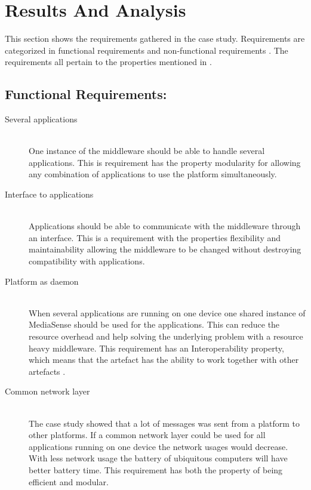 \section{Results And Analysis}
This section shows the requirements gathered in the case study. Requirements are categorized in functional requirements and non-functional requirements \cite{Roman1985}. The requirements all pertain to the properties mentioned in \cite{johannesson2012design}. 

\subsection{Functional Requirements:}
\begin{description}
	\item[Several applications] \hfill \\
	One instance of the middleware should be able to handle several applications.
	This is requirement has the property modularity for allowing any combination of applications to use the platform simultaneously.
		
	
	\item[Interface to applications] \hfill \\
	Applications should be able to communicate with the middleware through an interface.
	This is a requirement with the properties flexibility and maintainability allowing the middleware to be changed without destroying compatibility with applications.
	
	\item[Platform as daemon] \hfill \\
	When several applications are running on one device one shared instance of MediaSense should be used for the applications. This can reduce the resource overhead and help solving the underlying problem with a resource heavy middleware. This requirement has an Interoperability property, which means that the artefact has the ability to work together with other artefacts \cite{johannesson2012design}. 
	
	\item[Common network layer] \hfill \\
	The case study showed that a lot of messages was sent from a platform to other platforms. If a common network layer could be used for all applications running on one device the network usages would decrease. With less network usage the battery of ubiquitous computers will have better battery time. This requirement has both the property of being efficient and modular. 
	

\end{description}
